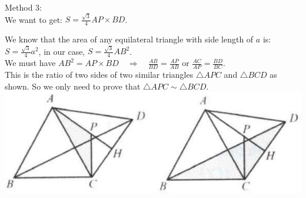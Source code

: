 \documentclass{article}
\begin{document}
Method 3:\\
We want to get: \(S=\frac{\sqrt{3}}{4} A P \times B D\).


We know that the area of any equilateral triangle with side length of \(a\) is:\\
\(S=\frac{\sqrt{3}}{4} a^{2}\), in our case, \(S=\frac{\sqrt{3}}{4} A B^{2}\).\\
We must have \(A B^{2}=A P \times B D \quad \Rightarrow \quad \frac{A B}{B D}=\frac{A P}{A B}\) or \(\frac{A C}{A P}=\frac{B D}{B C}\).\\
This is the ratio of two sides of two similar triangles \(\triangle A P C\) and \(\triangle B C D\) as shown. So we only need to prove that \(\triangle A P C \sim \triangle B C D\).\\
\centering
\includegraphics[width=\textwidth]{images/199(1).jpg}
\end{document}

